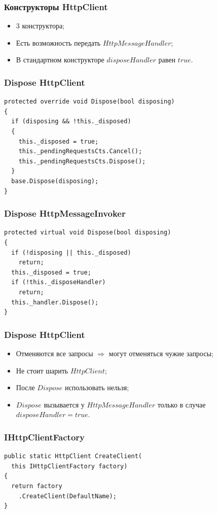 \documentclass[17pt,aspectratio=169]{beamer}
\begin{document}
\begin{frame}
\frametitle{Конструкторы HttpClient}
\begin{itemize}
	\item <1-> 3 конструктора;
	\item <2-> Есть возможность передать $HttpMessageHandler$;
	\item <3-> В стандартном конструкторе $disposeHandler$ равен $true$.
\end{itemize}
\end{frame}

\begin{frame}[fragile]
\frametitle{Dispose HttpClient}
\begin{lstlisting}
protected override void Dispose(bool disposing)
{
  if (disposing && !this._disposed)
  {
    this._disposed = true;
    this._pendingRequestsCts.Cancel();
    this._pendingRequestsCts.Dispose();
  }
  base.Dispose(disposing);
}
\end{lstlisting}
\end{frame}

\begin{frame}[fragile]
\frametitle{Dispose HttpMessageInvoker}
\begin{lstlisting}
protected virtual void Dispose(bool disposing)
{
  if (!disposing || this._disposed)
    return;
  this._disposed = true;
  if (!this._disposeHandler)
    return;
  this._handler.Dispose();
}
\end{lstlisting}
\end{frame}

\begin{frame}
\frametitle{Dispose HttpClient}
\begin{itemize}
	\item <1-> Отменяются все запросы $\Rightarrow$ могут отменяться чужие запросы;
	\item <2-> Не стоит шарить $HttpClient$;
	\item <3-> После $Dispose$ использовать нельзя;
	\item <4-> $Dispose$ вызывается у $HttpMessageHandler$ только в случае $disposeHandler = true$.
\end{itemize}
\end{frame}

\begin{frame}[fragile]
\frametitle{IHttpClientFactory}
\begin{lstlisting}
public static HttpClient CreateClient(
  this IHttpClientFactory factory)
{
  return factory
    .CreateClient(DefaultName);
}
\end{lstlisting}
\end{frame}
\end{document}
